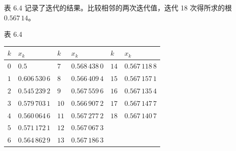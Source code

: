\documentclass[
  10pt,
  fontset=fandol]{ctexart}
\newcounter{none} %
\begin{document}
表 6.4 记录了迭代的结果。比较相邻的两次迭代值，迭代 18 次得所求的根 \(0.567\,14\)。

表 6.4

{\def\LTcaptype{none} %
\begin{longtable}[]{@{}
  >{\raggedright\arraybackslash}p{}
  >{\raggedright\arraybackslash}p{}
  >{\raggedright\arraybackslash}p{}
  >{\raggedright\arraybackslash}p{}
  >{\raggedright\arraybackslash}p{}
  >{\raggedright\arraybackslash}p{}@{}}
\toprule\noalign{}
\begin{minipage}[b]{\linewidth}\raggedright
\(k\)
\end{minipage} & \begin{minipage}[b]{\linewidth}\raggedright
\(x_k\)
\end{minipage} & \begin{minipage}[b]{\linewidth}\raggedright
\(k\)
\end{minipage} & \begin{minipage}[b]{\linewidth}\raggedright
\(x_k\)
\end{minipage} & \begin{minipage}[b]{\linewidth}\raggedright
\(k\)
\end{minipage} & \begin{minipage}[b]{\linewidth}\raggedright
\(x_k\)
\end{minipage} \\
\midrule\noalign{}
\endhead
\bottomrule\noalign{}
\endlastfoot
\(0\) & \(0.5\) & \(7\) & \(0.568\,438\,0\) & \(14\) & \(0.567\,118\,8\) \\
\(1\) & \(0.606\,530\,6\) & \(8\) & \(0.566\,409\,4\) & \(15\) & \(0.567\,157\,1\) \\
\(2\) & \(0.545\,239\,2\) & \(9\) & \(0.567\,559\,6\) & \(16\) & \(0.567\,135\,4\) \\
\(3\) & \(0.579\,703\,1\) & \(10\) & \(0.566\,907\,2\) & \(17\) & \(0.567\,147\,7\) \\
\(4\) & \(0.560\,064\,6\) & \(11\) & \(0.567\,277\,2\) & \(18\) & \(0.567\,140\,7\) \\
\(5\) & \(0.571\,172\,1\) & \(12\) & \(0.567\,067\,3\) & & \\
\(6\) & \(0.564\,862\,9\) & \(13\) & \(0.567\,186\,3\) & & \\
\end{longtable}
}
\end{document}
